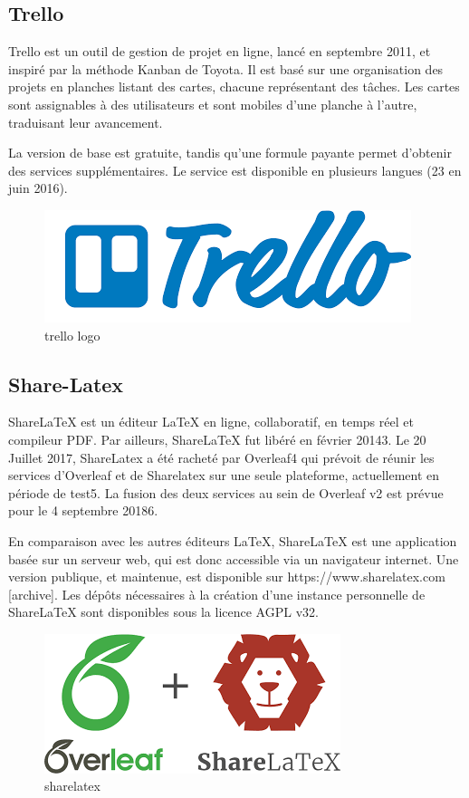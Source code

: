 \documentclass[oneside,12pt,a4paper]{book}
\begin{document}
\subsection{Trello}
Trello est un outil de gestion de projet en ligne, lancé en septembre 2011, et inspiré par la méthode Kanban de Toyota. Il est basé sur une organisation des projets en planches listant des cartes, chacune représentant des tâches. Les cartes sont assignables à des utilisateurs et sont mobiles d'une planche à l'autre, traduisant leur avancement.

La version de base est gratuite, tandis qu'une formule payante permet d'obtenir des services supplémentaires. Le service est disponible en plusieurs langues (23 en juin 2016).

\begin{figure}[ht]
\centering\includegraphics[width=0.7\linewidth]{trello.png}
\caption{trello logo}
\end{figure}

\subsection{Share-Latex}
ShareLaTeX est un éditeur LaTeX en ligne, collaboratif, en temps réel et compileur PDF. Par ailleurs, ShareLaTeX fut libéré en février 20143. Le 20 Juillet 2017, ShareLatex a été racheté par Overleaf4 qui prévoit de réunir les services d'Overleaf et de Sharelatex sur une seule plateforme, actuellement en période de test5. La fusion des deux services au sein de Overleaf v2 est prévue pour le 4 septembre 20186.

En comparaison avec les autres éditeurs LaTeX, ShareLaTeX est une application basée sur un serveur web, qui est donc accessible via un navigateur internet. Une version publique, et maintenue, est disponible sur https://www.sharelatex.com [archive]. Les dépôts nécessaires à la création d'une instance personnelle de ShareLaTeX sont disponibles sous la licence AGPL v32.
\begin{figure}[ht]
\centering\includegraphics[width=0.7\linewidth]{sharelatex.png}
\caption{sharelatex}
\end{figure}
\end{document}
